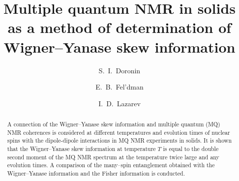 \documentclass[preprint,12pt]{elsarticle}
\begin{document}
\begin{frontmatter}



\title{Multiple quantum NMR in solids as a method of determination of Wigner--Yanase skew information}





\author[icp]{S.~I.~Doronin}
\author[icp]{E.~B.~Fel'dman}
\author[icp,msu]{I.~D.~Lazarev}
\address[icp]{Institute of Problems of Chemical Physics of Russian Academy of Sciences, \\ Chernogolovka, Moscow Region, Russia 142432}
\address[msu]{Faculty of Fundamental Physical-Chemical Engineering, Lomonosov Moscow State University, GSP-1, Moscow, Russia 119991}

\begin{abstract}
A connection of the Wigner--Yanase skew information and multiple quantum (MQ) NMR coherences is considered at different temperatures and evolution times of nuclear spins with the dipole-dipole interactions in MQ NMR experiments in solids.
It is shown that the Wigner--Yanase skew information at temperature $T$ is equal to the double second moment of the MQ NMR spectrum at the temperature twice large and any evolution times.
A comparison of the many--spin entanglement obtained with the Wigner--Yanase information and the Fisher information is conducted.
\end{abstract}


\end{frontmatter}
\end{document}
